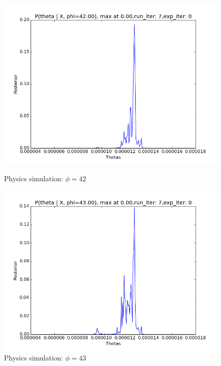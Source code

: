\documentclass[10pt,journal,compsoc]{IEEEtran}
\begin{document}
\begin{figure}[ht!]
\begin{minipage}[b]{0.5\linewidth}
\centering
\includegraphics[width=1\linewidth]{PhysicsPlots/LP2.png} 
\caption{\label{fig:LP2}Physics simulation: $\phi=42$}
\end{minipage}%
\begin{minipage}[b]{0.5\linewidth}
\centering
\includegraphics[width=1\linewidth]{PhysicsPlots/LP3.png} 
\caption{\label{fig:LP3}Physics simulation: $\phi=43$}
\end{minipage} 
\begin{minipage}[b]{0.5\linewidth}
\centering

\end{minipage}
\end{figure}
\end{document}

